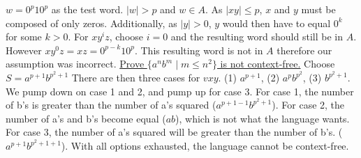 \documentclass[9pt]{article}
\begin{document}
$w = 0^p10^p$ as the test word. $|w|>p$ and $w\in A$. As $|xy|\leq p$, $x$ and $y$ must 
be composed of only zeros. Additionally, as $|y|>0$, $y$ would then have to equal $0^k$ 
for some $k>0$. For $xy^iz$, choose $i=0$ and the resulting word should still be in $A$. 
However $xy^0z=xz = 0^{p-k}10^p$. This resulting word is not in $A$ therefore our 
assumption was incorrect.\newline
\uline{Prove $\{a^nb^m \mid m \leq n^2\}$ is not context-free.} Choose $S = a^{p+1}
b^{p^2+1}$ There are then three cases for $vxy$. (1) $a^{p+1}$, (2) $a^pb^{p^2}$, (3) 
$b^{p^2+1}$. We pump down on case 1 and 2, and pump up for case 3. For case 1, the 
number of b's is greater than the number of a's squared ($a^{p+1-1}b^{p^2+1}$). For 
case 2, the number of a's and b's become equal ($ab$), which is not what the language 
wants. For case 3, the number of a's squared will be greater than the number of b's.
($a^{p+1}b^{p^2+1+1}$). With all options exhausted, the language cannot be context-free.
\end{document}
